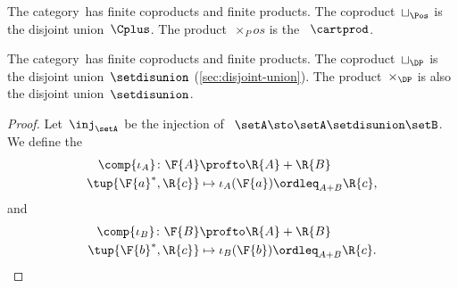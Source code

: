 \begin{example}
    The category~\Pos has finite coproducts and finite products.
    The coproduct~$\sqcup_\Pos$ is the disjoint union~$\Cplus$.
    The product~$\times_Pos$ is the ~$\cartprod$.
\end{example}

\begin{lemma}
    The category~\DP has finite coproducts and finite products.
    The coproduct~$\sqcup_\DP$ is the disjoint union~$\setdisunion$ (\cref{sec:disjoint-union}).
    The product~$\times_\DP$ is also the disjoint union~$\setdisunion$.
\end{lemma}

\begin{proof}
    Let~$\inj_\setA$ be the injection of ~$\setA \sto \setA\setdisunion\setB$.
    We define the  \begin{equation}
        \begin{aligned}
            \comp{\iota_A} \colon \F{A} & \profto \R{A} + \R{B} \\
            \tup{\F{a}^*,\R{c}}         & \mapsto \iota_A(\F{a})\ordleq_{A+B}\R{c},
        \end{aligned}
    \end{equation}
    and
    \begin{equation}
        \begin{aligned}
            \comp{\iota_B} \colon \F{B} & \profto \R{A} + \R{B} \\
            \tup{\F{b}^*,\R{c}}         & \mapsto \iota_B(\F{b})\ordleq_{A+B}\R{c}.
        \end{aligned}
    \end{equation}


\end{proof}
